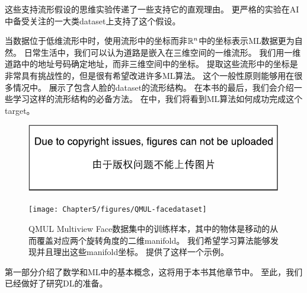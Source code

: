 
这些支持流形假设的思维实验传递了一些支持它的直观理由。
更严格的实验\citep{Cayton-2005,Narayanan+Mitter-NIPS2010,Scholkopf98-book,Roweis2000-lle-small,Tenenbaum2000-isomap,Brand2003,Belkin+Niyogi-nips2003,Donoho+Carrie-03,Weinberger04a}在\gls{AI}中备受关注的一大类\gls{dataset}上支持了这个假设。

当数据位于低维流形中时，使用流形中的坐标而非$\mathbb{R}^n$中的坐标表示\gls{ML}数据更为自然。
日常生活中，我们可以认为道路是嵌入在三维空间的一维流形。
我们用一维道路中的地址号码确定地址，而非三维空间中的坐标。
提取这些流形中的坐标是非常具有挑战性的，但是很有希望改进许多\gls{ML}算法。
这个一般性原则能够用在很多情况中。
展示了包含人脸的\gls{dataset}的流形结构。
在本书的最后，我们会介绍一些学习这样的流形结构的必备方法。
在中，我们将看到\gls{ML}算法如何成功完成这个\gls{target}。

\begin{figure}[!htb]
\ifOpenSource
\centerline{\includegraphics{figure.pdf}}
\else
\centerline{\texttt{[image: Chapter5/figures/QMUL-facedataset]}}
\fi
\caption{QMUL Multiview Face数据集中的训练样本\citep{Gong-et-al-2000}，其中的物体是移动的从而覆盖对应两个旋转角度的二维\gls{manifold}。
我们希望学习算法能够发现并且理出这些\gls{manifold}坐标。
提供了这样一个示例。}
\label{fig:chap5_QMUL-facedataset}
\end{figure}

第一部分介绍了数学和\gls{ML}中的基本概念，这将用于本书其他章节中。
至此，我们已经做好了研究\gls{DL}的准备。



